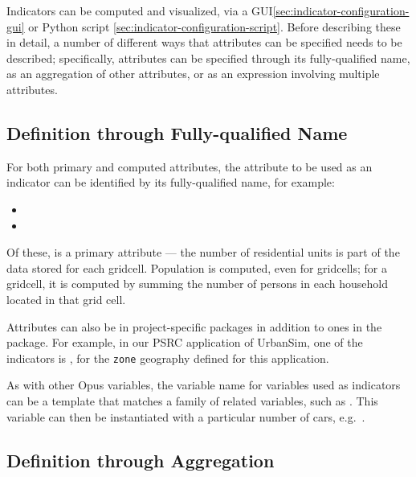 Indicators can be computed and visualized, via a
GUI\ref{sec:indicator-configuration-gui} or Python script
\ref{sec:indicator-configuration-script}. Before describing these in detail, 
a number of different ways that attributes can be specified needs to be
described; specifically, attributes can be specified through its
fully-qualified name, as an aggregation of other attributes, or as an expression
involving multiple attributes. 

\subsection{Definition through Fully-qualified Name}

For both primary \primaryattributesindex and computed attributes,
\computedattributesindex the attribute \attributesindex to be used as an
indicator \indicatorsindex can be identified by its fully-qualified name,
for example:

\begin{itemize}
\tight
\item {}
\item {}
\end{itemize}

Of these,  is a
primary \primaryattributesindex attribute --- the number of residential
units is part of the data stored for each gridcell. 
\computedattributesindex Population is computed, even for
gridcells; for a gridcell, it is computed by summing the number of
persons in each household located in that grid cell. 

Attributes \attributesindex can also be in project-specific packages in
addition to ones in the  package.  For example, in our
PSRC \psrcindex application of UrbanSim, one of the indicators
\indicatorsindex is
, for the
\verb|zone| geography defined for this application.

As with other Opus variables, \variablesindex the variable \variablesindex
name for variables \variablesindex used as indicators \indicatorsindex can
be a template that matches a family of related variables, \variablesindex
such as .  This variable
\variablesindex can then be instantiated with a particular number of cars,
e.g.\ .

\subsection{Definition through Aggregation}

